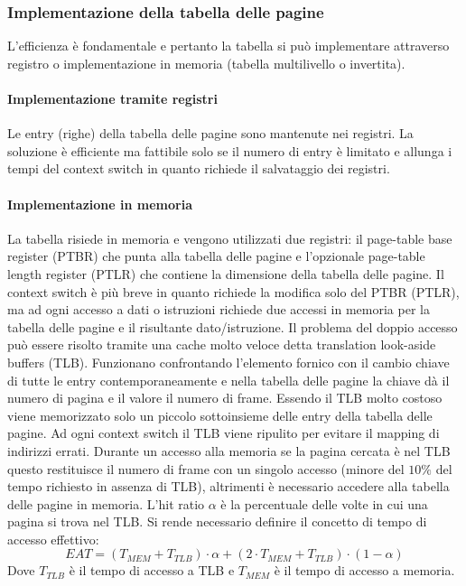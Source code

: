 \subsubsection{Implementazione della tabella delle pagine}
L'efficienza \`e fondamentale e pertanto la tabella si pu\`o implementare attraverso registro o implementazione in memoria (tabella multilivello o invertita).
\paragraph{Implementazione tramite registri}
Le entry (righe) della tabella delle pagine sono mantenute nei registri. La soluzione \`e efficiente ma fattibile solo se il numero di entry \`e limitato e allunga i tempi del context
switch in quanto richiede il salvataggio dei registri. 
\paragraph{Implementazione in memoria}
La tabella risiede in memoria e vengono utilizzati due registri: il page-table base register (PTBR) che punta alla tabella delle pagine e l'opzionale page-table length register (PTLR) 
che contiene la dimensione della tabella delle pagine. Il context switch \`e pi\`u breve in quanto richiede la modifica solo del PTBR (PTLR), ma ad ogni accesso a dati o istruzioni 
richiede due accessi in memoria per la tabella delle pagine e il risultante dato/istruzione. Il problema del doppio accesso pu\`o essere risolto tramite una cache molto veloce
detta translation look-aside buffers (TLB). Funzionano confrontando l'elemento fornico con il cambio chiave di tutte le entry contemporaneamente e nella tabella delle pagine la
chiave d\`a il numero di pagina e il valore il numero di frame. Essendo il TLB molto costoso viene memorizzato solo un piccolo sottoinsieme delle entry della tabella delle pagine. Ad
ogni context switch il TLB viene ripulito per evitare il mapping di indirizzi errati. Durante un accesso alla memoria se la pagina cercata \`e nel TLB questo restituisce il numero di 
frame con un singolo accesso (minore del $10\%$ del tempo richiesto in assenza di TLB), altrimenti \`e necessario accedere alla tabella delle pagine in memoria. L'hit ratio $\alpha$ \`e
la percentuale delle volte in cui una pagina si trova nel TLB. Si rende necessario definire il concetto di tempo di accesso effettivo: 
$$EAT = (T_{MEM} + T_{TLB})\cdot\alpha + (2\cdot T_{MEM} + T_{TLB})\cdot (1-\alpha)$$
Dove $T_{TLB}$ \`e il tempo di accesso a TLB e $T_{MEM}$ \`e il tempo di accesso a memoria.
